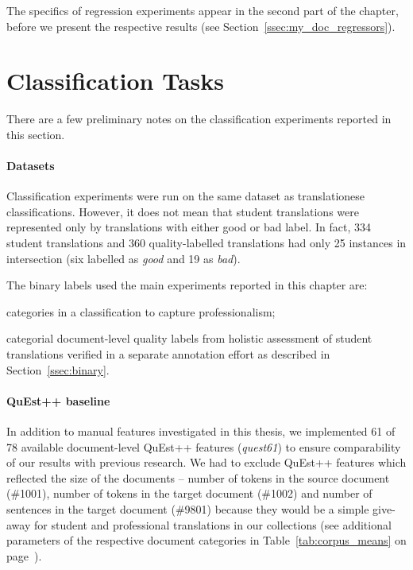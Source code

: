 The specifics of regression experiments appear in the second part of the chapter, before we present the respective results (see Section~\ref{ssec:my_doc_regressors}).

\section{\label{sec:labels}Classification Tasks}

There are a few preliminary notes on the classification experiments reported in this section. 

\paragraph{Datasets} 
Classification experiments were run on the same dataset as translationese classifications. However, it does not mean that student translations were represented only by translations with either good or bad label. In fact, 334 student translations and 360 quality-labelled translations had only 25 instances in intersection (six labelled as \textit{good} and 19 as \textit{bad}). 

The binary labels used the main experiments reported in this chapter are: 
\begin{description}\compresslist{}
	\item[stu vs pro:] categories in a classification to capture professionalism;
	\item[bad vs good:] categorial document-level quality labels from holistic assessment of student translations verified in a separate annotation effort as described in Section~\ref{ssec:binary}.
\end{description}

\paragraph{QuEst++ baseline}
In addition to manual features investigated in this thesis, we implemented 61 of 78 available document-level QuEst++ features (\textit{quest61}) to ensure comparability of our results with previous research.
We had to exclude QuEst++ features which reflected the size of the documents -- number of tokens in the source document (\#1001), number of tokens in the target document (\#1002) and number of sentences in the target document (\#9801) because they would be a simple give-away for student and professional translations in our collections (see additional parameters of the respective document categories in Table~\ref{tab:corpus_means} on page~\pageref{tab:corpus_means}).  

